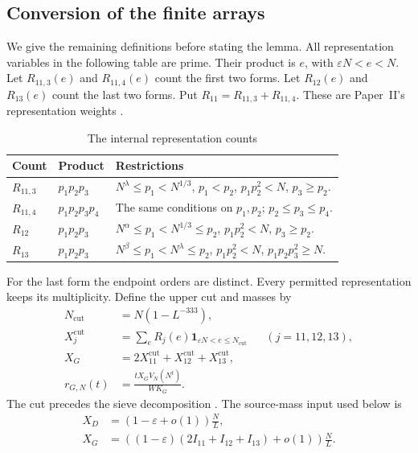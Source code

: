 \subsection{Conversion of the finite arrays}

We give the remaining definitions before stating the lemma.
All representation variables in the following table are prime.
Their product is $e$, with $\varepsilon N<e<N$.
Let $R_{11,3}(e)$ and $R_{11,4}(e)$ count the first two forms.
Let $R_{12}(e)$ and $R_{13}(e)$ count the last two forms.
Put $R_{11}=R_{11,3}+R_{11,4}$.
These are Paper~II's representation weights
\cite[(4.4), source table preceding (4.4)]{PaperII}.

\begin{table}[ht]
\caption{The internal representation counts}\label{tab:retB-representations}
\small
\renewcommand{\arraystretch}{1.15}
\begin{tabular}{@{}llp{.64\linewidth}@{}}
\hline
Count & Product & Restrictions\\
\hline
$R_{11,3}$ & $p_1p_2p_3$ &
$N^\lambda\le p_1<N^{1/3}$, $p_1<p_2$, $p_1p_2^2<N$, $p_3\ge p_2$.\\
$R_{11,4}$ & $p_1p_2p_3p_4$ &
The same conditions on $p_1,p_2$; $p_2\le p_3\le p_4$.\\
$R_{12}$ & $p_1p_2p_3$ &
$N^\alpha\le p_1<N^{1/3}\le p_2$, $p_1p_2^2<N$, $p_3\ge p_2$.\\
$R_{13}$ & $p_1p_2p_3$ &
$N^\beta\le p_1<N^\lambda\le p_2$, $p_1p_2^2<N$, $p_1p_2p_3^2\ge N$.\\
\hline
\end{tabular}
\end{table}
For the last form the endpoint orders are distinct.
Every permitted representation keeps its multiplicity.
Define the upper cut and masses by
\begin{equation}\label{eq:retB-source-normalizations}
\begin{aligned}
 N_{\mathrm{cut}}&=N(1-L^{-333}),\\
 X_j^{\mathrm{cut}}&=\sum_eR_j(e)
           \mathbf1_{\varepsilon N<e\le N_{\mathrm{cut}}}
                &&(j=11,12,13),\\
 X_G&=2X_{11}^{\mathrm{cut}}+X_{12}^{\mathrm{cut}}+X_{13}^{\mathrm{cut}},\\
 r_{G,N}(t)&=\frac{tX_GV_N(N^t)}{WK_G}.
\end{aligned}
\end{equation}
The cut precedes the sieve decomposition
\cite[(4.16)--(4.17)]{PaperII}.
The source-mass input used below is
\begin{equation}\label{eq:retB-source-mass-limits}
\begin{aligned}
 X_D&=\left(1-\varepsilon+o(1)\right)\frac NL,\\
 X_G&=\left((1-\varepsilon)(2I_{11}+I_{12}+I_{13})+o(1)\right)
                                                   \frac NL.
\end{aligned}
\end{equation}

